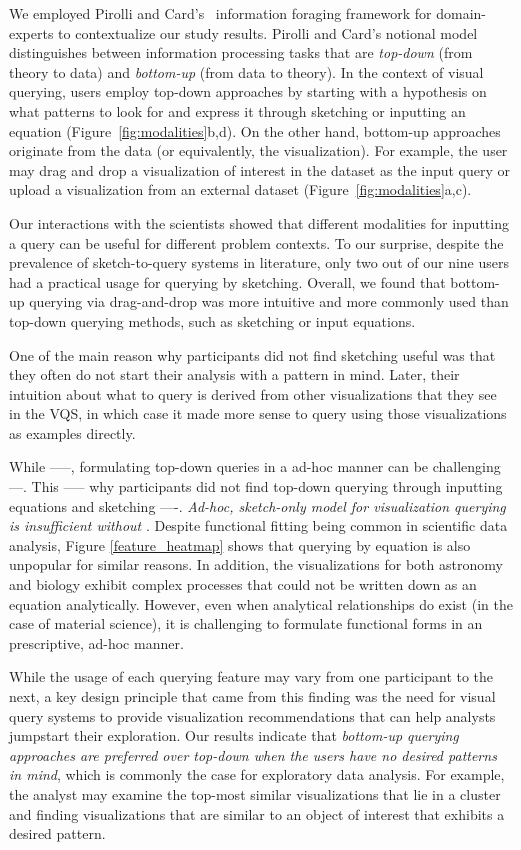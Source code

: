 We employed Pirolli and Card's~\cite{Pirolli} information foraging framework for domain-experts to contextualize our study results. Pirolli and Card's notional model distinguishes between information processing tasks that are \textit{top-down} (from theory to data) and \textit{bottom-up} (from data to theory). In the context of visual querying, users employ top-down approaches by starting with a hypothesis on what patterns to look for and express it through sketching or inputting an equation (Figure~\ref{fig:modalities}b,d). On the other hand, bottom-up approaches originate from the data (or equivalently, the visualization). For example, the user may drag and drop a visualization of interest in the dataset as the input query or upload a visualization from an external dataset (Figure~\ref{fig:modalities}a,c). 
\par Our interactions with the scientists showed that different modalities for inputting a query can be useful for different problem contexts. To our surprise, despite the prevalence of sketch-to-query systems in literature, only two out of our nine users had a practical usage for querying by sketching. Overall, we found that bottom-up querying via drag-and-drop was more intuitive and more commonly used than top-down querying methods, such as sketching or input equations. 
\par One of the main reason why participants did not find sketching useful was that they often do not start their analysis with a pattern in mind. Later, their intuition about what to query is derived from other visualizations that they see in the VQS, in which case it made more sense to query using those visualizations as examples directly. 
\par While -----, formulating top-down queries in a ad-hoc manner can be challenging ---. This ----- why participants did not find top-down querying through inputting equations and sketching ----. \emph{Ad-hoc, sketch-only model for visualization querying is insufficient without }. Despite functional fitting being common in scientific data analysis, Figure \ref{feature_heatmap} shows that querying by equation is also unpopular for similar reasons. In addition, the visualizations for both astronomy and biology exhibit complex processes that could not be written down as an equation analytically. However, even when analytical relationships do exist (in the case of material science), it is challenging to formulate functional forms in an prescriptive, ad-hoc manner. 
\par While the usage of each querying feature may vary from one participant to the next, a key design principle that came from this finding was the need for visual query systems to provide visualization recommendations that can help analysts jumpstart their exploration. Our results indicate that \emph{bottom-up querying approaches are preferred over top-down when the users have no desired patterns in mind}, which is commonly the case for exploratory data analysis. For example, the analyst may examine the top-most similar visualizations that lie in a cluster and finding visualizations that are similar to an object of interest that exhibits a desired pattern. 
